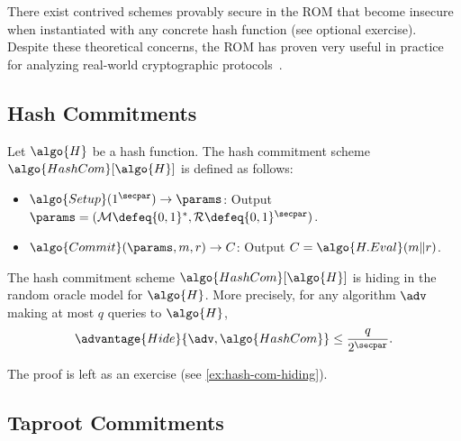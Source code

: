   There exist contrived schemes provably secure in the ROM that become insecure when instantiated with any concrete hash function (see optional exercise).
  Despite these theoretical concerns, the ROM has proven very useful in practice for analyzing real-world cryptographic protocols~\cite{DCC:KobMen15}.

\subsection{Hash Commitments}

\begin{definition}
  Let $\algo{H}$ be a hash function.
  The hash commitment scheme $\algo{HashCom}[\algo{H}]$ is defined as follows:
  \begin{itemize}
    \item $\algo{Setup}(1^\secpar) \rightarrow \params$: Output $\params = (\mathcal{M} \defeq \{0, 1\}^*, \mathcal{R} \defeq \{0, 1\}^\secpar)$.
    \item $\algo{Commit}(\params, m, r) \rightarrow C$: Output $C = \algo{H.Eval}(m \| r)$.
  \end{itemize}
\end{definition}

\begin{lemma}\label{lem:hash-com-hiding}
  The hash commitment scheme $\algo{HashCom}[\algo{H}]$ is hiding in the random oracle model for $\algo{H}$.
  More precisely, for any algorithm $\adv$ making at most $q$ queries to $\algo{H}$,
  \[
  \advantage{Hide}{\adv, \algo{HashCom}} \leq \frac{q}{2^\secpar}.
  \]
\end{lemma}

The proof is left as an exercise (see \autoref{ex:hash-com-hiding}).

\subsection{Taproot Commitments}

